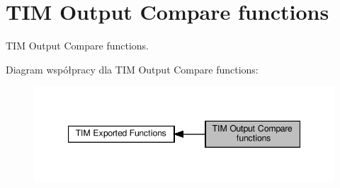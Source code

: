 \hypertarget{group___t_i_m___exported___functions___group2}{}\section{T\+IM Output Compare functions}
\label{group___t_i_m___exported___functions___group2}


T\+IM Output Compare functions.  


Diagram współpracy dla T\+IM Output Compare functions\+:\nopagebreak
\begin{figure}[H]
\begin{center}
\leavevmode
\includegraphics[width=347pt]{group___t_i_m___exported___functions___group2}
\end{center}
\end{figure}
